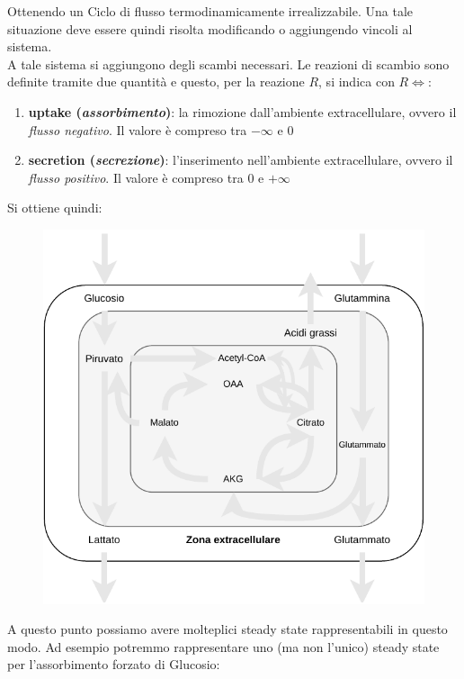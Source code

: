 \documentclass[a4paper,12pt, oneside]{book}
\begin{document}
Ottenendo un Ciclo di flusso termodinamicamente irrealizzabile.
Una tale situazione deve essere quindi risolta modificando o aggiungendo vincoli
al sistema.\\
A tale sistema si aggiungono degli scambi necessari. Le reazioni di scambio sono
definite tramite due quantità e questo, per la reazione $R$, si indica con
$R\iff$: 
\begin{enumerate}
  \item \textbf{uptake (\textit{assorbimento})}: la rimozione dall'ambiente
  extracellulare, ovvero il \textit{flusso negativo}. Il valore è compreso tra
  $-\infty$ e $0$ 
  \item \textbf{secretion (\textit{secrezione})}: l'inserimento nell'ambiente
  extracellulare, ovvero il \textit{flusso positivo}. Il valore è compreso tra
  $0$ e $+\infty$ 
\end{enumerate}
Si ottiene quindi:
\begin{figure}[H]
  \centering
  \includegraphics[scale = 0.58]{img/toy3.pdf}
\end{figure}
A questo punto possiamo avere molteplici steady state rappresentabili in questo
modo. Ad esempio potremmo rappresentare uno (ma non l'unico) steady state per
l'assorbimento forzato di Glucosio:
\end{document}
